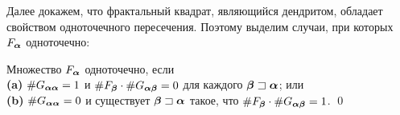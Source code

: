 Далее докажем, что фрактальный квадрат, являющийся дендритом, обладает свойством одноточечного пересечения.
Поэтому выделим случаи, при которых $F_{\bm{\alpha}}$ одноточечно:

\begin{corollary}\label{onepoint} 
Множество $F_{\bm{\alpha}}$ одноточечно, если \\
\textbf{(a)} $\#G_{{\bm{\alpha}}{\bm{\alpha}}}=1$ и $\#F_{\bm{\beta}}\cdot\#G_{{\bm{\alpha}}{\bm{\beta}}}=0$ для каждого ${\bm{\beta}}\sqsupset{\bm{\alpha}}$; или\\
\textbf{(b)} $\#G_{{\bm{\alpha}}{\bm{\alpha}}}=0$ и существует ${\bm{\beta}}\sqsupset{\bm{\alpha}}$ такое, что $\#F_{\bm{\beta}}\cdot\#G_{{\bm{\alpha}}{\bm{\beta}}}=1$.
\hfill\qed
\end{corollary}

%
%
%
